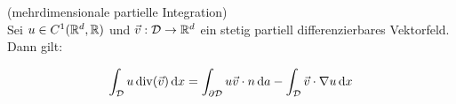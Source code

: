 \begin{Folgerung}(mehrdimensionale partielle Integration) \\
	\label{n_pI}
	Sei $ u \in C^1(\mathbb{R}^d, \mathbb{R})$ und $ \vec v : \mathcal{D} \to \mathbb{R}^d $ ein stetig partiell differenzierbares Vektorfeld.
	Dann gilt:
	
	\begin{align*}
		\int_{\mathcal{D}} u \operatorname{div} ( \vec v) \, \mathrm{d} x = \int_{\partial \mathcal{D}} u \vec v \cdot n \, \mathrm{d} a
		- \int_{\mathcal{D}} \vec v \cdot \nabla u \, \mathrm{d} x
	\end{align*}
\end{Folgerung}





